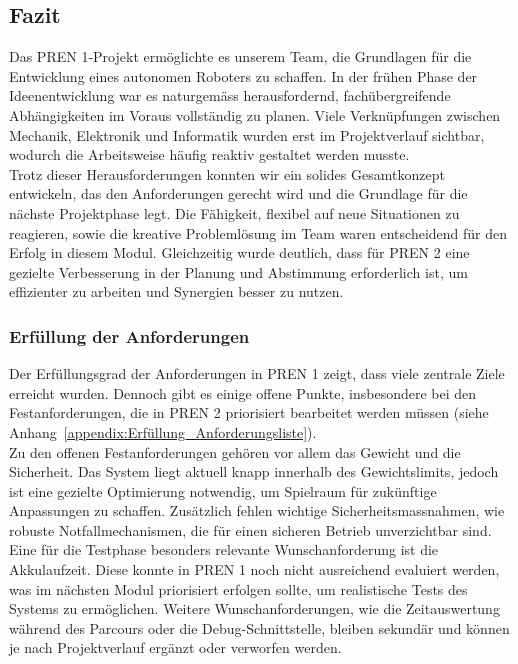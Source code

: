 \documentclass[main.tex]{subfiles} %
\begin{document}

\subsection{Fazit}

Das PREN 1-Projekt ermöglichte es unserem Team, die Grundlagen für die  
Entwicklung eines autonomen Roboters zu schaffen. In der frühen Phase der  
Ideenentwicklung war es naturgemäss herausfordernd, fachübergreifende  
Abhängigkeiten im Voraus vollständig zu planen. Viele Verknüpfungen zwischen  
Mechanik, Elektronik und Informatik wurden erst im Projektverlauf sichtbar,  
wodurch die Arbeitsweise häufig reaktiv gestaltet werden musste.\\

Trotz dieser Herausforderungen konnten wir ein solides Gesamtkonzept entwickeln,  
das den Anforderungen gerecht wird und die Grundlage für die nächste  
Projektphase legt. Die Fähigkeit, flexibel auf neue Situationen zu reagieren,  
sowie die kreative Problemlösung im Team waren entscheidend für den Erfolg  
in diesem Modul. Gleichzeitig wurde deutlich, dass für PREN 2 eine gezielte  
Verbesserung in der Planung und Abstimmung erforderlich ist, um effizienter  
zu arbeiten und Synergien besser zu nutzen. 

\subsubsection{Erfüllung der Anforderungen}  
Der Erfüllungsgrad der Anforderungen in PREN 1 zeigt, dass viele zentrale Ziele  
erreicht wurden. Dennoch gibt es einige offene Punkte, insbesondere bei den  
Festanforderungen, die in PREN 2 priorisiert bearbeitet werden müssen 
(siehe Anhang~\ref{appendix:Erfüllung_Anforderungsliste}).\\

Zu den offenen Festanforderungen gehören vor allem das Gewicht und die Sicherheit.  
Das System liegt aktuell knapp innerhalb des Gewichtslimits, jedoch ist eine gezielte  
Optimierung notwendig, um Spielraum für zukünftige Anpassungen zu schaffen.  
Zusätzlich fehlen wichtige Sicherheitsmassnahmen, wie robuste Notfallmechanismen,  
die für einen sicheren Betrieb unverzichtbar sind.\\

Eine für die Testphase besonders relevante Wunschanforderung ist die Akkulaufzeit.  
Diese konnte in PREN 1 noch nicht ausreichend evaluiert werden, was im nächsten  
Modul priorisiert erfolgen sollte, um realistische Tests des Systems zu ermöglichen.  
Weitere Wunschanforderungen, wie die Zeitauswertung während des Parcours oder  
die Debug-Schnittstelle, bleiben sekundär und können je nach Projektverlauf  
ergänzt oder verworfen werden.\\
\end{document}
